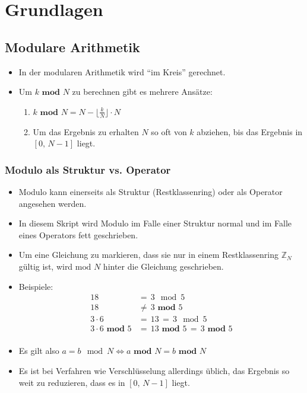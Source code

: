 \chapter{Grundlagen}
	\section{Modulare Arithmetik}
		\begin{itemize}
			\item In der modularen Arithmetik wird \enquote{im Kreis} gerechnet.
			\item Um \( k \textbf{ mod } N \) zu berechnen gibt es mehrere Ansätze:
				\begin{enumerate}
					\item \( k \textbf{ mod } N = N - \lfloor \frac{k}{N} \rfloor \cdot N \)
					\item Um das Ergebnis zu erhalten \(N\) so oft von \(k\) abziehen, bis das Ergebnis in \( [0,\, N - 1] \) liegt.
				\end{enumerate}
		\end{itemize}

		\subsection{Modulo als Struktur vs. Operator}
			\begin{itemize}
				\item Modulo kann einerseits als Struktur (Restklassenring) oder als Operator angesehen werden.
				\item In diesem Skript wird Modulo im Falle einer Struktur normal und im Falle eines Operators fett geschrieben.
				\item Um eine Gleichung zu markieren, dass sie nur in einem Restklassenring \( \mathbb{Z} _ N \) gültig ist, wird \(\text{mod } N \) hinter die Gleichung geschrieben.
				\item Beispiele:
					\begin{align*}
						18                         & =\, 3 \mod 5 \tag{Restklassenring}                              \\
						18                         & \neq\, 3 \textbf{ mod } 5 \tag{Operator}                        \\
						3 \cdot 6                  & =\, 13 \,=\, 3 \mod 5 \tag{Restklassenring}                     \\
						3 \cdot 6 \textbf{ mod } 5 & =\, 13 \textbf{ mod } 5 \,=\, 3 \textbf{ mod } 5 \tag{Operator} \\
					\end{align*}
				\item Es gilt also \( a = b \mod N \iff a \textbf{ mod } N = b \textbf{ mod } N \)
				\item Es ist bei Verfahren wie Verschlüsselung allerdings üblich, das Ergebnis so weit zu reduzieren, dass es in \( [0,\, N - 1] \) liegt.
			\end{itemize}

